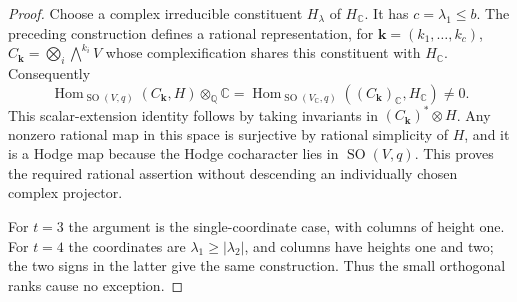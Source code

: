 \documentclass[11pt]{amsart}
\newcommand{\Q}{\mathbb Q}
\newcommand{\C}{\mathbb C}
\DeclareMathOperator{\Hom}{Hom}
\DeclareMathOperator{\SO}{SO}
\theoremstyle{definition}
\theoremstyle{remark}
\numberwithin{equation}{section}
\begin{document}
\begin{proof}
Choose a complex irreducible constituent $H_\lambda$ of $H_\C$.
It has $c=\lambda_1\le b$.  The preceding construction defines a
rational representation, for $\mathbf k=(k_1,\ldots,k_c)$,
$C_{\mathbf k}=\bigotimes_i\bigwedge^{k_i}V$ whose complexification shares
this constituent with $H_\C$.  Consequently
\[
 \Hom_{\SO(V,q)}(C_{\mathbf k},H)\otimes_\Q\C
 =\Hom_{\SO(V_\C,q)}((C_{\mathbf k})_\C,H_\C)\ne0.
\]
This scalar-extension identity follows by taking invariants in
$(C_{\mathbf k})^*\otimes H$.  Any nonzero rational map in this space is
surjective by rational simplicity of $H$, and it is a Hodge map
because the Hodge cocharacter lies in $\SO(V,q)$.
This proves the required rational assertion without descending
an individually chosen complex projector.

For $t=3$ the argument is the single-coordinate case, with columns
of height one.  For $t=4$ the coordinates are
$\lambda_1\ge|\lambda_2|$, and columns have heights one and two;
the two signs in the latter give the same construction.  Thus the
small orthogonal ranks cause no exception.
\end{proof}
\end{document}
